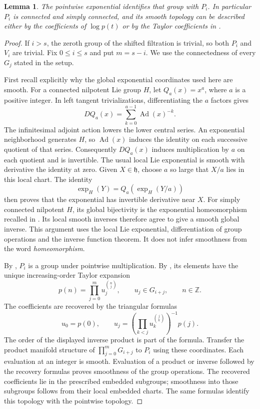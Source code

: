 \documentclass[11pt]{article}
\newtheorem{lemma}[theorem]{Lemma}
\newcommand{\Z}{\mathbb Z}
\begin{document}
\begin{lemma}\label{lem:Pi}
The pointwise exponential identifies that group with $P_i$. In particular
$P_i$ is connected and simply connected, and its smooth topology can be
described either by the coefficients of $\log p(t)$ or by the Taylor
coefficients in \cite[Lemma B.9]{GTZ}.
\end{lemma}
\begin{proof}
If $i>s$, the zeroth group of the shifted filtration is trivial, so both
$P_i$ and $V_i$ are trivial. Fix $0\leq i\leq s$ and put $m=s-i$.
We use the connectedness of every $G_j$ stated in the setup.

First recall explicitly why the global exponential coordinates used here
are smooth. For a connected nilpotent Lie group $H$, let $Q_a(x)=x^a$,
where $a$ is a positive integer. In left tangent trivializations,
differentiating the $a$ factors gives
\[
 DQ_a(x)=\sum_{k=0}^{a-1}\operatorname{Ad}(x)^{-k}.
\]
The infinitesimal adjoint action lowers the lower central series.
An exponential neighborhood generates $H$, so $\operatorname{Ad}(x)$
induces the identity on each successive quotient of that series.
Consequently $DQ_a(x)$ induces multiplication by $a$ on each quotient
and is invertible. The usual local Lie exponential is smooth with
derivative the identity at zero. Given $X\in\mathfrak h$, choose $a$ so
large that $X/a$ lies in this local chart. The identity
\[
 \exp_H(Y)=Q_a(\exp_H(Y/a))
\]
then proves that the exponential has invertible derivative near $X$.
For simply connected nilpotent $H$, its global bijectivity is the
exponential homeomorphism recalled in \cite[Section 3]{GTZ}.
Its local smooth inverses therefore agree to give a smooth global inverse.
This argument uses the local Lie exponential, differentiation of group
operations and the inverse function theorem. It does not infer
smoothness from the word \emph{homeomorphism}.

By \cite[Proposition B.6]{GTZ}, $P_i$ is a group under pointwise
multiplication. By \cite[Lemma B.9]{GTZ}, its elements have the unique
increasing-order Taylor expansion
\[
 p(n)=\prod_{j=0}^{m}u_j^{\binom nj},\qquad u_j\in G_{i+j},
 \qquad n\in\Z.
\]
The coefficients are recovered by the triangular formulas
\[
 u_0=p(0),\qquad
 u_j=\left(\prod_{k<j}u_k^{\binom jk}\right)^{-1}p(j).
\]
The order of the displayed inverse product is part of the formula.
Transfer the product manifold structure of $\prod_{j=0}^m G_{i+j}$
to $P_i$ using these coordinates. Each evaluation at an integer is
smooth. Evaluation of a product or inverse followed by the recovery
formulas proves smoothness of the group operations. The recovered
coefficients lie in the prescribed embedded subgroups; smoothness into
those subgroups follows from their local embedded charts.
The same formulas identify this topology with the pointwise topology.


\end{proof}
\end{document}
